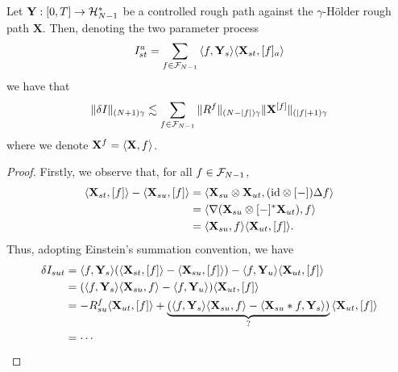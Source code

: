 \documentclass[11pt]{style/preprint}
\begin{document}
\begin{proposition}
  Let \(\mathbf{Y} : [0, T] \to {\mathcal H}^*_{N - 1}\) be a controlled rough path against the \(\gamma\)-H\"older 
  rough path \(\mathbf{X}\). Then, denoting the two parameter process
  \[I_{st}^a = \sum_{f \in \CF_{N - 1}} \< f, \mathbf{Y}_s\> \< \mathbf{X}_{st}, [f]_a\>\] 
  we have that 
  \[\|\delta I\|_{(N + 1)\gamma} \lesssim \sum_{f \in {\mathcal F}_{N - 1}} \|R^f\|_{(N - |f|)\gamma} \|\mathbf{X}^{[f]}\|_{(|f| + 1)\gamma}\]
  where we denote \(\mathbf{X}^f = \< \mathbf{X}, f\>\).
\end{proposition}
\begin{proof}
  Firstly, we observe that, for all \(f \in {\mathcal F}_{N - 1}\),
  \begin{align*}
    \<\mathbf{X}_{st}, [f]\> - \< \mathbf{X}_{su}, [f]\> 
    & = \< \mathbf{X}_{su} \otimes \mathbf{X}_{ut}, (\text{id} \otimes [-]) \Delta f\>\\
    & = \< \nabla (\mathbf{X}_{su} \otimes [-]^* \mathbf{X}_{ut}), f\>\\ 
    & = \< \mathbf{X}_{su}, f\> \< \mathbf{X}_{ut}, [f]\>.
  \end{align*}
  Thus, adopting Einstein's summation convention, we have
  \begin{align*}
    \delta I_{sut} & = \< f, \mathbf{Y}_s\>(\<\mathbf{X}_{st}, [f]\> - \< \mathbf{X}_{su}, [f]\>) 
      - \< f, \mathbf{Y}_u\> \< \mathbf{X}_{ut}, [f]\>\\
    & = (\< f, \mathbf{Y}_s\> \< \mathbf{X}_{su}, f\> - \< f, \mathbf{Y}_u\>) 
        \< \mathbf{X}_{ut}, [f]\>\\
    & = - R^f_{su} \< \mathbf{X}_{ut}, [f]\> 
      + \underbrace{(\< f, \mathbf{Y}_s\> \< \mathbf{X}_{su}, f\> -
          \< \mathbf{X}_{su} * f, \mathbf{Y}_s\>)}_{\text{?}}
        \< \mathbf{X}_{ut}, [f]\>\\
    & = \cdots
  \end{align*}
\end{proof}
\end{document}
